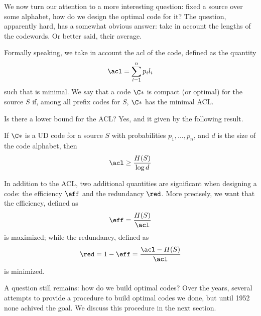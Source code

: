 \documentclass{subfiles}
\begin{document}
    We now turn our attention to a more interesting question: 
        fixed a source over some alphabet, how do we design the optimal code for it?
        The question, apparently hard, has a somewhat obvious answer:
        take in account the lengths of the codewords. Or better said, 
        their average.

    Formally speaking, we take in account the \gls{acl} of the code, 
        defined as the quantity
        \[
            \acl = \sum_{i = 1}^{n} p_{i}l_{i}
        \]
        such that is minimal. We say that a code \(\C*\) is compact (or optimal) for the source 
        \(S\) if, among all prefix codes for \(S\), \(\C*\) has the minimal ACL.

    \begin{remark*}
        Is there a lower bound for the ACL? Yes, and it given by the following result.
        \begin{lemma*}[Shannon]
            If \(\C*\) is a UD code for a source \(S\) with probabilities 
            \(p_{1}, \ldots, p_{n}\), and \(d\) is the size of the code alphabet,
            then
            \[
                \acl \ge \frac{H(S)}{\log d}
            \]
        \end{lemma*}
    \end{remark*}

    In addition to the ACL, two additional quantities are significant when designing a 
        code: the efficiency \(\eff\) and the redundancy \(\red\). More precisely,
        we want that the efficiency, defined as 
        \[
            \eff = \frac{H(S)}{\acl}
        \]
        is maximized; while the redundancy, defined as 
        \[
            \red = 1 - \eff = \frac{\acl - H(S)}{\acl}
        \]
        is minimized.

    A question still remains: how do we build optimal codes? 
        Over the years, several attempts to provide a procedure to build optimal codes 
        we done, but until 1952 none achived the goal. 
        We discuss this procedure in the next section.
        \clearpage
\end{document}
